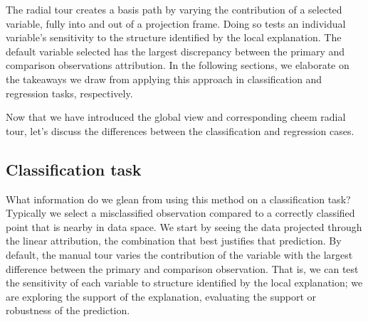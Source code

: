 \documentclass[
  article]{article}
\begin{document}
The radial tour creates a basis path by varying the contribution of a selected variable, fully into and out of a projection frame. Doing so tests an individual variable's sensitivity to the structure identified by the local explanation. The default variable selected has the largest discrepancy between the primary and comparison observations attribution. In the following sections, we elaborate on the takeaways we draw from applying this approach in classification and regression tasks, respectively.

Now that we have introduced the global view and corresponding cheem radial tour, let's discuss the differences between the classification and regression cases.

\hypertarget{classification-task}{%
\subsection{Classification task}\label{classification-task}}

What information do we glean from using this method on a classification task? Typically we select a misclassified observation compared to a correctly classified point that is nearby in data space. We start by seeing the data projected through the linear attribution, the combination that best justifies that prediction. By default, the manual tour varies the contribution of the variable with the largest difference between the primary and comparison observation. That is, we can test the sensitivity of each variable to structure identified by the local explanation; we are exploring the support of the explanation, evaluating the support or robustness of the prediction.
\end{document}
